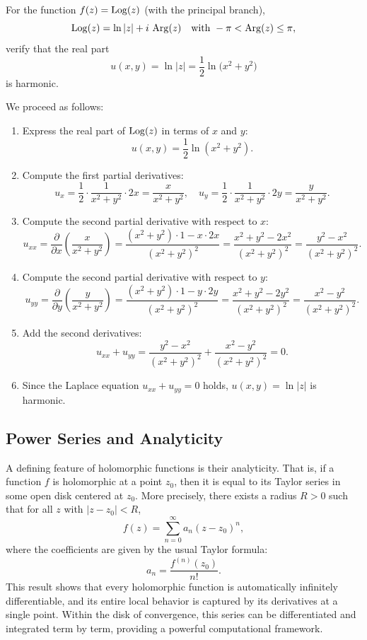 \exampleline
\begin{example}
For the function \(f(z) = \operatorname{Log}(z)\) (with the principal branch),
\[
\operatorname{Log}(z)=\ln|z|+i\,\operatorname{Arg}(z) \quad \text{with } -\pi < \operatorname{Arg}(z) \le \pi,
\]
verify that the real part 
\[
u(x,y)=\ln|z|=\frac{1}{2}\ln\bigl(x^2+y^2\bigr)
\]
is harmonic.
\begin{solution}
We proceed as follows:

\begin{enumerate}
    \item Express the real part of \(\operatorname{Log}(z)\) in terms of \(x\) and \(y\):
    \[
    u(x,y)=\frac{1}{2}\ln(x^2+y^2).
    \]
    
    \item Compute the first partial derivatives:
    \[
    u_x=\frac{1}{2}\cdot\frac{1}{x^2+y^2}\cdot 2x=\frac{x}{x^2+y^2},\quad 
    u_y=\frac{1}{2}\cdot\frac{1}{x^2+y^2}\cdot 2y=\frac{y}{x^2+y^2}.
    \]
    
    \item Compute the second partial derivative with respect to \(x\):
    \[
    u_{xx}=\frac{\partial}{\partial x}\left(\frac{x}{x^2+y^2}\right)
    =\frac{(x^2+y^2)\cdot 1- x\cdot 2x}{(x^2+y^2)^2}
    =\frac{x^2+y^2-2x^2}{(x^2+y^2)^2}
    =\frac{y^2-x^2}{(x^2+y^2)^2}.
    \]
    
    \item Compute the second partial derivative with respect to \(y\):
    \[
    u_{yy}=\frac{\partial}{\partial y}\left(\frac{y}{x^2+y^2}\right)
    =\frac{(x^2+y^2)\cdot 1- y\cdot 2y}{(x^2+y^2)^2}
    =\frac{x^2+y^2-2y^2}{(x^2+y^2)^2}
    =\frac{x^2-y^2}{(x^2+y^2)^2}.
    \]
    
    \item Add the second derivatives:
    \[
    u_{xx}+u_{yy}=\frac{y^2-x^2}{(x^2+y^2)^2}+\frac{x^2-y^2}{(x^2+y^2)^2}=0.
    \]
    
    \item Since the Laplace equation \(u_{xx}+u_{yy}=0\) holds, \(u(x,y)=\ln|z|\) is harmonic.
\end{enumerate}
\end{solution}
\end{example}
\exampleline
\subsection*{Power Series and Analyticity} 

\noindent A defining feature of holomorphic functions is their analyticity. That is, if a function \(f\) is holomorphic at a point \(z_0\), then it is equal to its Taylor series in some open disk centered at \(z_0\). More precisely, there exists a radius \(R > 0\) such that for all \(z\) with \(|z - z_0| < R\),
\[
f(z) = \sum_{n=0}^{\infty} a_n (z - z_0)^n,
\]
where the coefficients are given by the usual Taylor formula:
\[
a_n = \frac{f^{(n)}(z_0)}{n!}.
\]
This result shows that every holomorphic function is automatically infinitely differentiable, and its entire local behavior is captured by its derivatives at a single point. Within the disk of convergence, this series can be differentiated and integrated term by term, providing a powerful computational framework. \\

